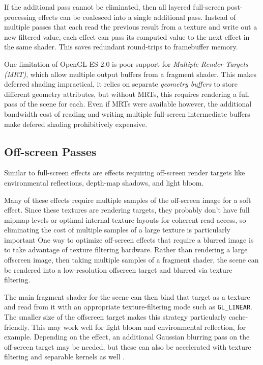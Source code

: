 If the additional pass cannot be eliminated, then all layered full-screen
post-processing effects can be coalesced into a single additional pass.
Instead of multiple passes that each read the previous result from a texture
and write out a new filtered value, each effect can pass its computed value to
the next effect in the same shader.  This saves redundant round-trips to
framebuffer memory.

One limitation of OpenGL ES 2.0 is poor support for \textit{Multiple Render
Targets (MRT)}, which allow multiple output buffers from a fragment shader.
This makes deferred shading impractical, it relies on separate \textit{geometry
buffers} to store different geometry attributes, but without MRTs, this
requires rendering a full pass of the scene for each.  Even if MRTs
were available however, the additional bandwidth cost of reading and writing
multiple full-screen intermediate buffers make defered shading prohibitively expensive.

\subsection{Off-screen Passes}
\label{Jon-McCaffrey-Off-Screen-Pass}

Similar to full-screen effects are effects requiring off-screen render targets
like environmental reflections, depth-map shadows, and light bloom.

Many of these effects require multiple samples of the off-screen image for a
soft effect.  Since these textures are rendering targets, they probably don't
have full mipmap levels or optimal internal texture layouts for coherent read
access, so eliminating the cost of multiple samples of a large texture is
particularly important One way to optimize off-screen effects that require a
blurred image is to take advantage of texture filtering hardware.  Rather than
rendering a large offscreen image, then taking multiple samples of a fragment
shader, the scene can be rendered into a low-resolution offscreen target and
blurred via texture filtering.

The main fragment shader for the scene can then bind that target as a texture
and read from it with an appropriate texture-filtering mode such as \texttt{GL\_LINEAR}.
The smaller size of the offscreen target makes this strategy particularly
cache-friendly.  This may work well for light bloom and environmental
reflection, for example.  Depending on the effect, an additional Gaussian
blurring pass on the off-screen target may be needed, but these can also be
accelerated with texture filtering and separable kernels as well \cite{Rideout}.

